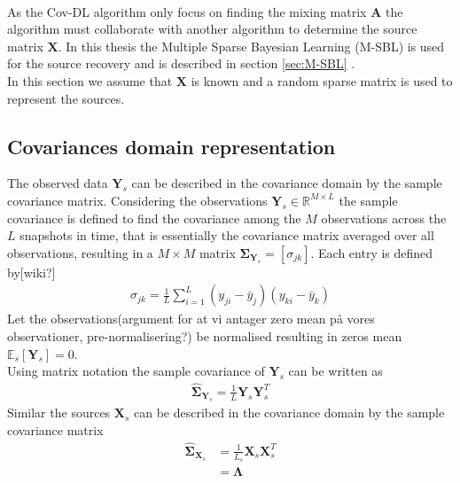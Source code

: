 \\
As the Cov-DL algorithm only focus on finding the mixing matrix $\mathbf{A}$ the algorithm must collaborate with another algorithm to determine the source matrix $\mathbf{X}$. In this thesis the Multiple Sparse Bayesian Learning (M-SBL) is used for the source recovery and is described in section \ref{sec:M-SBL} . 
\\
In this section we assume that $\mathbf{X}$ is known and a random sparse matrix is used to represent the sources. 


\subsection{Covariances domain representation}
The observed data $\mathbf{Y}_s$ can be described in the covariance domain by the sample covariance matrix. Considering the observations $\mathbf{Y}_s \in \mathbb{R}^{M\times L}$ the sample covariance is defined to find the covariance among the $M$ observations across the $L$ snapshots in time, that is essentially the covariance matrix averaged over all observations, resulting in a $M \times M$ matrix $\boldsymbol{\Sigma}_{\mathbf{Y}_s}=[\sigma_{jk}]$. Each entry is defined by[wiki?] 
\begin{align*}
\sigma_{jk}= \frac{1}{L}\sum_{i=1}^{L}(y_{ji}- \bar{y}_j)(y_{ki}-\bar{y}_k)
\end{align*}
Let the observations(argument for at vi antager zero mean på vores observationer, pre-normalisering?) be normalised resulting in zeros mean $\mathbb{E}_s[\mathbf{Y}_s]=0$. \\
Using matrix notation the sample covariance of $\mathbf{Y}_s$ can be written as
\begin{align*}
\hat{\boldsymbol{\Sigma}}_{\mathbf{Y}_s} = \frac{1}{L} \mathbf{Y}_s \mathbf{Y}_s^T
\end{align*}  
Similar the sources $\mathbf{X}_s$ can be described in the covariance domain by the sample covariance matrix
\begin{align*}
\hat{\boldsymbol{\Sigma}}_{\mathbf{X}_s} &= \frac{1}{L_s} \mathbf{X}_s \mathbf{X}_s^T \\
&= \boldsymbol{\Lambda}
\end{align*}
